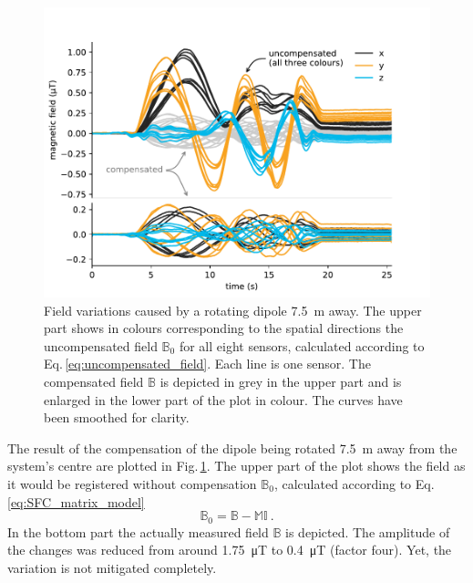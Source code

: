 
\begin{figure}
  \centering
  \includegraphics[width=\linewidth]{gfx/prototype/compensated_7_5m_double.pdf}
  \caption{Field variations caused by a rotating dipole \SI{7.5}{\meter} away.
  The upper part shows in colours corresponding to the spatial directions the uncompensated field $\mathbb{B}_0$ for all eight sensors, calculated according to Eq.\,\ref{eq:uncompensated_field}. Each line is one sensor. The compensated field $\mathbb{B}$ is depicted in grey in the upper part and is enlarged in the lower part of the plot in colour. The curves have been smoothed for clarity.}\label{fig:prototype_compensation_time}
\end{figure}

The result of the compensation of the dipole being rotated \SI{7.5}{\meter} away from the system's centre are plotted in Fig.\,\ref{fig:prototype_compensation_time}. The upper part of the plot shows the field as it would be registered without compensation $\mathbb{B}_0$, calculated according to Eq.\,\ref{eq:SFC_matrix_model}
\begin{equation}
  \label{eq:uncompensated_field}
  \mathbb{B}_0 = \mathbb{B} - \mathbb{M} \mathbb{I} \ .
\end{equation}
In the bottom part the actually measured field $\mathbb{B}$ is depicted. The amplitude of the changes was reduced from around \SI{1.75}{\micro\tesla} to \SI{0.4}{\micro\tesla} (factor four). Yet, the variation is not mitigated completely.

